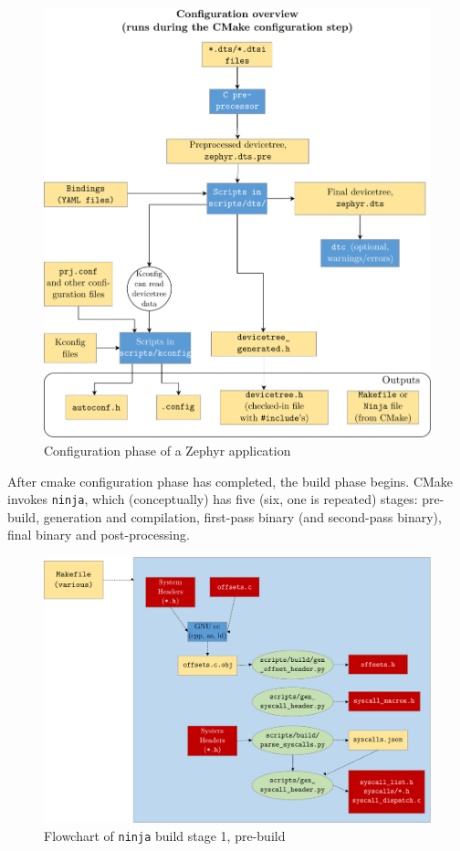 \begin{figure}[htbp]
	\centering
	\includegraphics[width=\textwidth]{Figures/3_cmake_configuration.pdf}
	\caption[Configuration phase of a Zephyr application]{Configuration phase of a Zephyr application \cite{zephyrprojectdocumentation}}
	\label{fig:3_cmake_configuration}
\end{figure}
After cmake configuration phase has completed, the build phase begins. CMake invokes \texttt{ninja}, which (conceptually) has five (six, one is repeated) stages: pre-build, generation and compilation, first-pass binary (and second-pass binary), final binary and post-processing.
\begin{figure}[htbp]
	\centering
	\includegraphics[width=\textwidth]{Figures/3_cmake_build1.pdf}
	\caption[Flowchart of ninja stage 1, pre-build]{Flowchart of \texttt{ninja} build stage 1, pre-build\cite{zephyrprojectdocumentation}}
	\label{fig:3_build1}
\end{figure}
